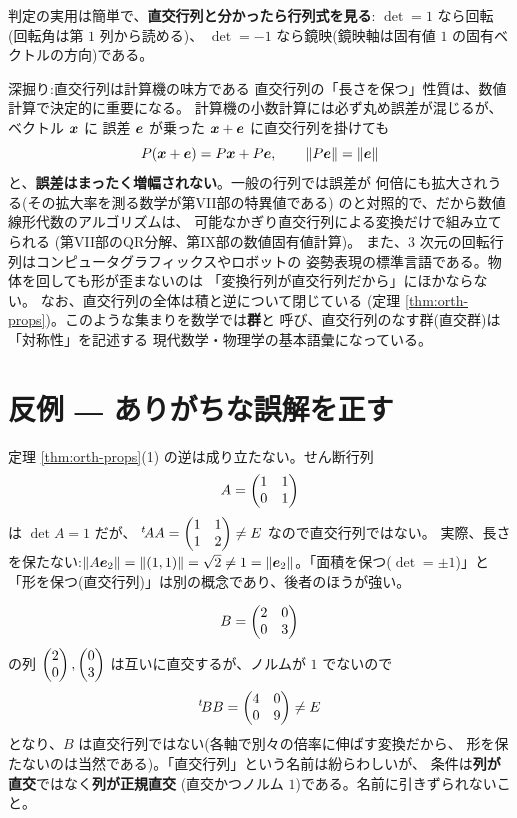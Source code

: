判定の実用は簡単で、\textbf{直交行列と分かったら行列式を見る}:
$\det = 1$ なら回転(回転角は第 $1$ 列から読める)、
$\det = -1$ なら鏡映(鏡映軸は固有値 $1$ の固有ベクトルの方向)である。

\begin{itembox}[l]{深掘り:直交行列は計算機の味方である}
直交行列の「長さを保つ」性質は、数値計算で決定的に重要になる。
計算機の小数計算には必ず丸め誤差が混じるが、ベクトル $\bm{x}$ に
誤差 $\bm{e}$ が乗った $\bm{x} + \bm{e}$ に直交行列を掛けても
\[
P(\bm{x} + \bm{e}) = P\bm{x} + P\bm{e}, \qquad
\|P\bm{e}\| = \|\bm{e}\|
\]
と、\textbf{誤差はまったく増幅されない}。一般の行列では誤差が
何倍にも拡大されうる(その拡大率を測る数学が第VII部の特異値である)
のと対照的で、だから数値線形代数のアルゴリズムは、
可能なかぎり直交行列による変換だけで組み立てられる
(第VII部のQR分解、第IX部の数値固有値計算)。
また、$3$ 次元の回転行列はコンピュータグラフィックスやロボットの
姿勢表現の標準言語である。物体を回しても形が歪まないのは
「変換行列が直交行列だから」にほかならない。
なお、直交行列の全体は積と逆について閉じている
(定理 \ref{thm:orth-props})。このような集まりを数学では\textbf{群}と
呼び、直交行列のなす群(直交群)は「対称性」を記述する
現代数学・物理学の基本語彙になっている。
\end{itembox}

\section{反例 ― ありがちな誤解を正す}

\begin{hanrei}[$\det = \pm 1$ でも直交行列とは限らない]\label{hanrei:orth-det}
定理 \ref{thm:orth-props}(1) の逆は成り立たない。せん断行列
\[
A = \begin{pmatrix}1 & 1 \\ 0 & 1\end{pmatrix}
\]
は $\det A = 1$ だが、
${}^t\!A A = \begin{pmatrix}1 & 1 \\ 1 & 2\end{pmatrix} \neq E$ なので直交行列ではない。
実際、長さを保たない:$\|A\bm{e}_2\| = \|(1, 1)\| = \sqrt{2} \neq 1
= \|\bm{e}_2\|$。「面積を保つ($\det = \pm 1$)」と
「形を保つ(直交行列)」は別の概念であり、後者のほうが強い。
\end{hanrei}

\begin{hanrei}[列が直交するだけでは足りない]\label{hanrei:orth-notnormal}
\[
B = \begin{pmatrix}2 & 0 \\ 0 & 3\end{pmatrix}
\]
の列 $\begin{pmatrix}2 \\ 0\end{pmatrix}, \begin{pmatrix}0 \\ 3\end{pmatrix}$ は互いに直交するが、ノルムが
$1$ でないので
\[
{}^t\!B B = \begin{pmatrix}4 & 0 \\ 0 & 9\end{pmatrix} \neq E
\]
となり、$B$ は直交行列ではない(各軸で別々の倍率に伸ばす変換だから、
形を保たないのは当然である)。「直交行列」という名前は紛らわしいが、
条件は\textbf{列が直交}ではなく\textbf{列が正規直交}
(直交かつノルム $1$)である。名前に引きずられないこと。
\end{hanrei}


